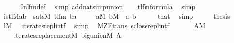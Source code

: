 \begin{isabellebody}
\ \ \ \ \ \ Inl{\isacharunderscore}{\kern0pt}fm{\isacharunderscore}{\kern0pt}def\ \isamarkupfalse%
\ {\isacharparenleft}{\kern0pt}simp\ add{\isacharcolon}{\kern0pt}nat{\isacharunderscore}{\kern0pt}simp{\isacharunderscore}{\kern0pt}union{\isacharparenright}{\kern0pt}\isanewline
\ \ \isamarkupfalse%
\ {}{\isacharcolon}{\kern0pt}{\isachardoublequoteopen}tl{\isacharunderscore}{\kern0pt}fm{\isacharparenleft}{\kern0pt}{}{\isacharcomma}{\kern0pt}{}{\isacharparenright}{\kern0pt}{\isasymin}formula{\isachardoublequoteclose}\ \isamarkupfalse%
\ simp\isanewline
\ \ \isamarkupfalse%
\ {\isachardoublequoteopen}is{\isacharunderscore}{\kern0pt}tl{\isacharparenleft}{\kern0pt}{\isacharhash}{\kern0pt}{\isacharhash}{\kern0pt}M{\isacharcomma}{\kern0pt}a{\isacharcomma}{\kern0pt}b{\isacharparenright}{\kern0pt}\ {\isasymlongleftrightarrow}\ sats{\isacharparenleft}{\kern0pt}M{\isacharcomma}{\kern0pt}\ tl{\isacharunderscore}{\kern0pt}fm{\isacharparenleft}{\kern0pt}{}{\isacharcomma}{\kern0pt}{}{\isacharparenright}{\kern0pt}{\isacharcomma}{\kern0pt}\ {\isacharbrackleft}{\kern0pt}b{\isacharcomma}{\kern0pt}a{\isacharbrackright}{\kern0pt}{\isacharparenright}{\kern0pt}{\isachardoublequoteclose}\isanewline
\ \ \ \ \ {\isachardoublequoteopen}a{\isasymin}M{\isachardoublequoteclose}\ {\isachardoublequoteopen}b{\isasymin}M{\isachardoublequoteclose}\ \ a\ b\isanewline
\ \ \ \ \isamarkupfalse%
\ that\ \isamarkupfalse%
\ simp\isanewline
\ \ \isamarkupfalse%
\ \isamarkupfalse%
\ {\isacharquery}{\kern0pt}thesis\ \isamarkupfalse%
\ {\isacartoucheopen}l{\isasymin}M{\isacartoucheclose}\ {}\ {}\ iterates{\isacharunderscore}{\kern0pt}repl{\isacharunderscore}{\kern0pt}intf\ \isamarkupfalse%
\ simp\isanewline
{}\isamarkupfalse%
%
\endisatagproof
{\isafoldproof}%
%
\isadelimproof
\isanewline
%
\endisadelimproof
\isanewline
\isanewline
{}\isamarkupfalse%
\ {\isacharparenleft}{\kern0pt}\ M{\isacharunderscore}{\kern0pt}ZF{\isacharunderscore}{\kern0pt}trans{\isacharparenright}{\kern0pt}\ eclose{\isacharunderscore}{\kern0pt}repl{}{\isacharunderscore}{\kern0pt}intf{\isacharcolon}{\kern0pt}\isanewline
\ \ \isanewline
\ \ \ \ {\isachardoublequoteopen}A{\isasymin}M{\isachardoublequoteclose}\isanewline
\ \ \isanewline
\ \ \ \ {\isachardoublequoteopen}iterates{\isacharunderscore}{\kern0pt}replacement{\isacharparenleft}{\kern0pt}{\isacharhash}{\kern0pt}{\isacharhash}{\kern0pt}M{\isacharcomma}{\kern0pt}\ big{\isacharunderscore}{\kern0pt}union{\isacharparenleft}{\kern0pt}{\isacharhash}{\kern0pt}{\isacharhash}{\kern0pt}M{\isacharparenright}{\kern0pt}{\isacharcomma}{\kern0pt}\ A{\isacharparenright}{\kern0pt}{\isachardoublequoteclose}\isanewline

\end{isabellebody}
